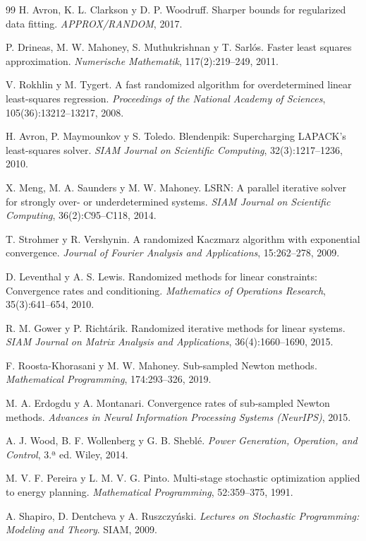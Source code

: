 \documentclass[11pt,a4paper,oneside]{book}
\theoremstyle{definition}
\theoremstyle{remark}
\begin{document}
\begin{thebibliography}{99}
 H. Avron, K. L. Clarkson y D. P. Woodruff. Sharper bounds for regularized data fitting.
\emph{APPROX/RANDOM}, 2017.

 P. Drineas, M. W. Mahoney, S. Muthukrishnan y T. Sarlós. Faster least squares approximation.
\emph{Numerische Mathematik}, 117(2):219--249, 2011.

 V. Rokhlin y M. Tygert. A fast randomized algorithm for overdetermined linear least-squares regression.
\emph{Proceedings of the National Academy of Sciences}, 105(36):13212--13217, 2008.

 H. Avron, P. Maymounkov y S. Toledo. Blendenpik: Supercharging LAPACK's least-squares solver.
\emph{SIAM Journal on Scientific Computing}, 32(3):1217--1236, 2010.

 X. Meng, M. A. Saunders y M. W. Mahoney. LSRN: A parallel iterative solver for strongly over- or
underdetermined systems. \emph{SIAM Journal on Scientific Computing}, 36(2):C95--C118, 2014.

 T. Strohmer y R. Vershynin. A randomized Kaczmarz algorithm with exponential convergence.
\emph{Journal of Fourier Analysis and Applications}, 15:262--278, 2009.

 D. Leventhal y A. S. Lewis. Randomized methods for linear constraints: Convergence rates and
conditioning. \emph{Mathematics of Operations Research}, 35(3):641--654, 2010.

 R. M. Gower y P. Richtárik. Randomized iterative methods for linear systems. \emph{SIAM Journal on
Matrix Analysis and Applications}, 36(4):1660--1690, 2015.

 F. Roosta-Khorasani y M. W. Mahoney. Sub-sampled Newton methods. \emph{Mathematical Programming},
174:293--326, 2019.

 M. A. Erdogdu y A. Montanari. Convergence rates of sub-sampled Newton methods. \emph{Advances in Neural
Information Processing Systems (NeurIPS)}, 2015.

 A. J. Wood, B. F. Wollenberg y G. B. Sheblé. \emph{Power Generation, Operation, and Control}, 3.ª ed.
Wiley, 2014.

 M. V. F. Pereira y L. M. V. G. Pinto. Multi-stage stochastic optimization applied to energy planning.
\emph{Mathematical Programming}, 52:359--375, 1991.

 A. Shapiro, D. Dentcheva y A. Ruszczyński. \emph{Lectures on Stochastic Programming: Modeling and
Theory}. SIAM, 2009.


\end{thebibliography}
\end{document}
